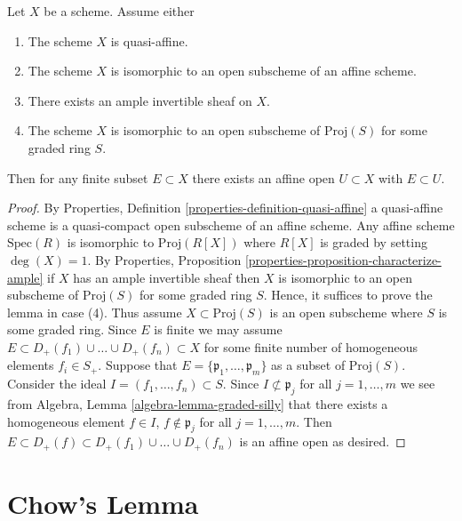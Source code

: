 \begin{lemma}
\label{lemma-ample-finite-set-in-affine}
Let $X$ be a scheme. Assume either
\begin{enumerate}
\item The scheme $X$ is quasi-affine.
\item The scheme $X$ is isomorphic to an open subscheme of an affine scheme.
\item There exists an ample invertible sheaf on $X$.
\item The scheme $X$ is isomorphic to an open subscheme
of $\text{Proj}(S)$ for some graded ring $S$.
\end{enumerate}
Then for any finite subset $E \subset X$ there exists an
affine open $U \subset X$ with $E \subset U$.
\end{lemma}

\begin{proof}
By Properties, Definition \ref{properties-definition-quasi-affine}
a quasi-affine scheme is a quasi-compact open subscheme
of an affine scheme. Any affine scheme $\text{Spec}(R)$ is isomorphic to
$\text{Proj}(R[X])$ where $R[X]$ is graded by setting $\deg(X) = 1$.
By Properties, Proposition \ref{properties-proposition-characterize-ample}
if $X$ has an ample invertible sheaf then $X$ is isomorphic to an open
subscheme of $\text{Proj}(S)$ for some graded ring $S$.
Hence, it suffices to prove the lemma in case (4).
Thus assume $X \subset \text{Proj}(S)$ is an open subscheme
where $S$ is some graded ring. Since $E$ is finite we may assume
$E \subset D_{+}(f_1) \cup \ldots \cup D_{+}(f_n) \subset X$
for some finite number of homogeneous elements $f_i \in S_{+}$.
Suppose that $E = \{\mathfrak p_1, \ldots, \mathfrak p_m\}$
as a subset of $\text{Proj}(S)$.
Consider the ideal $I = (f_1, \ldots, f_n) \subset S$.
Since $I \not \subset \mathfrak p_j$ for all $j = 1, \ldots, m$
we see from Algebra, Lemma \ref{algebra-lemma-graded-silly} that
there exists a homogeneous element $f \in I$, $f \not \in \mathfrak p_j$
for all $j = 1, \ldots, m$. Then $E \subset D_{+}(f) \subset
D_{+}(f_1) \cup \ldots \cup D_{+}(f_n)$ is an affine open as desired.
\end{proof}











\section{Chow's Lemma}
\label{section-chows-lemma}


